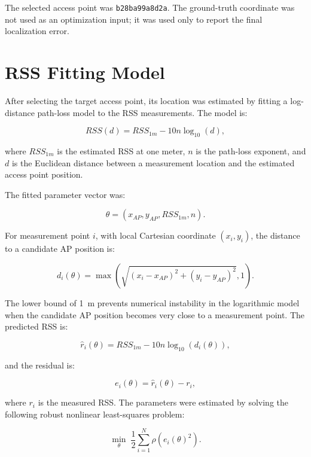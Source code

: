 \documentclass[11pt,a4paper]{article}
\begin{document}
The selected access point was \texttt{b28ba99a8d2a}. The ground-truth coordinate
was not used as an optimization input; it was used only to report the final
localization error.

\section{RSS Fitting Model}

After selecting the target access point, its location was estimated by fitting a
log-distance path-loss model to the RSS measurements. The model is:

\begin{equation}
RSS(d) = RSS_{1m} - 10n\log_{10}(d),
\end{equation}

where \(RSS_{1m}\) is the estimated RSS at one meter, \(n\) is the path-loss
exponent, and \(d\) is the Euclidean distance between a measurement location and
the estimated access point position.

The fitted parameter vector was:

\begin{equation}
\theta = (x_{AP}, y_{AP}, RSS_{1m}, n).
\end{equation}

For measurement point \(i\), with local Cartesian coordinate \((x_i,y_i)\), the
distance to a candidate AP position is:

\begin{equation}
d_i(\theta)=\max\left(\sqrt{(x_i-x_{AP})^2+(y_i-y_{AP})^2}, 1\right).
\end{equation}

The lower bound of \SI{1}{m} prevents numerical instability in the logarithmic
model when the candidate AP position becomes very close to a measurement point.
The predicted RSS is:

\begin{equation}
\widehat{r}_i(\theta)=RSS_{1m}-10n\log_{10}\left(d_i(\theta)\right),
\end{equation}

and the residual is:

\begin{equation}
e_i(\theta)=\widehat{r}_i(\theta)-r_i,
\end{equation}

where \(r_i\) is the measured RSS. The parameters were estimated by solving the
following robust nonlinear least-squares problem:

\begin{equation}
\min_{\theta}\; \frac{1}{2}\sum_{i=1}^{N}\rho\left(e_i(\theta)^2\right).
\end{equation}
\end{document}
